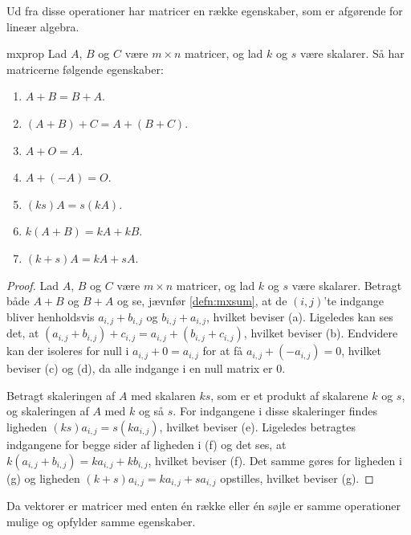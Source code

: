 Ud fra disse operationer har matricer en række egenskaber, som er afgørende for lineær algebra.
%
\begin{thm}{}{mxprop}
Lad $A$, $B$ og $C$ være $m \times n$ matricer, og lad $k$ og $s$ være skalarer.
Så har matricerne følgende egenskaber:
\begin{enumerate}[label=(\alph*)]
\item $A + B = B + A$.
\item $(A + B) + C = A + (B + C)$.
\item $A + O = A$.
\item $A + (-A) = O$.
\item $(ks)A = s(kA)$.
\item $k(A + B) = kA + kB$.
\item $(k + s)A = kA + sA$.
\end{enumerate}
\end{thm}
%
\begin{proof}
Lad $A$, $B$ og $C$ være $m \times n$ matricer, og lad $k$ og $s$ være skalarer.
Betragt både $A + B$ og $B + A$ og se, jævnfør \ref{defn:mxsum}, at de $(i,j)$'te indgange bliver henholdsvis $a_{i,j} + b_{i,j}$ og $b_{i,j} + a_{i,j}$, hvilket beviser (a).
Ligeledes kan ses det, at $(a_{i,j} + b_{i,j}) + c_{i,j} = a_{i,j} + (b_{i,j} + c_{i,j})$, hvilket beviser (b).
Endvidere kan der isoleres for null i $a_{i,j} + 0 = a_{i,j}$ for at få $a_{i,j} + (-a_{i,j}) = 0$, hvilket beviser (c) og (d), da alle indgange i en null matrix er $0$.

Betragt skaleringen af $A$ med skalaren $ks$, som er et produkt af skalarene $k$ og $s$, og skaleringen af $A$ med $k$ og så $s$.
For indgangene i disse skaleringer findes ligheden $(ks)a_{i,j} = s(ka_{i,j})$, hvilket beviser (e).
Ligeledes betragtes indgangene for begge sider af ligheden i (f) og det ses, at $k(a_{i,j} + b_{i,j}) = ka_{i,j} + kb_{i,j}$, hvilket beviser (f).
Det samme gøres for ligheden i (g) og ligheden $(k + s)a_{i,j} = ka_{i,j} + sa_{i,j}$ opstilles, hvilket beviser (g).
\end{proof}

Da vektorer er matricer med enten én række eller én søjle er samme operationer mulige og opfylder samme egenskaber.